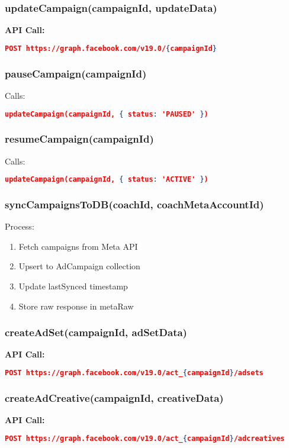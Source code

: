 \documentclass[11pt,a4paper]{article}
\begin{document}
\subsubsection{updateCampaign(campaignId, updateData)}
\textbf{API Call:}
\begin{lstlisting}[language=json]
POST https://graph.facebook.com/v19.0/{campaignId}
\end{lstlisting}

\subsubsection{pauseCampaign(campaignId)}
Calls:
\begin{lstlisting}[language=json]
updateCampaign(campaignId, { status: 'PAUSED' })
\end{lstlisting}

\subsubsection{resumeCampaign(campaignId)}
Calls:
\begin{lstlisting}[language=json]
updateCampaign(campaignId, { status: 'ACTIVE' })
\end{lstlisting}

\subsubsection{syncCampaignsToDB(coachId, coachMetaAccountId)}
Process:
\begin{enumerate}
  \item Fetch campaigns from Meta API
  \item Upsert to AdCampaign collection
  \item Update lastSynced timestamp
  \item Store raw response in metaRaw
\end{enumerate}

\subsubsection{createAdSet(campaignId, adSetData)}
\textbf{API Call:}
\begin{lstlisting}[language=json]
POST https://graph.facebook.com/v19.0/act_{campaignId}/adsets
\end{lstlisting}

\subsubsection{createAdCreative(campaignId, creativeData)}
\textbf{API Call:}
\begin{lstlisting}[language=json]
POST https://graph.facebook.com/v19.0/act_{campaignId}/adcreatives
\end{lstlisting}
\end{document}

